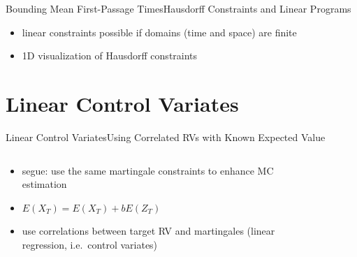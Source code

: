 \documentclass{beamer}
\newcommand{\expSym}{{E}}
\newcommand{\E}[1]{\ensuremath{\expSym\left(#1\right)}}
\begin{document}
\begin{frame}{Bounding Mean First-Passage Times}{Hausdorff Constraints and Linear Programs}
  \begin{itemize}
    \item linear constraints possible if domains (time and space) are finite
    \item 1D visualization of Hausdorff constraints
  \end{itemize}
\end{frame}

\section{Linear Control Variates}
\begin{frame}{Linear Control Variates}{Using Correlated RVs with Known Expected Value}
    \begin{columns}
        \begin{column}{.6\textwidth}
          \begin{itemize}
            \item segue: use the same martingale constraints to enhance MC estimation
            \item $\E{X_T}=\E{X_T}+b\E{Z_T}$
            \item use correlations between target RV and martingales (linear regression, i.e.\ control variates)
          \end{itemize}
        \end{column}
        \begin{column}{.38\textwidth}
            \begin{figure}

\end{figure}
\end{column}
\end{columns}
\end{frame}
\end{document}
